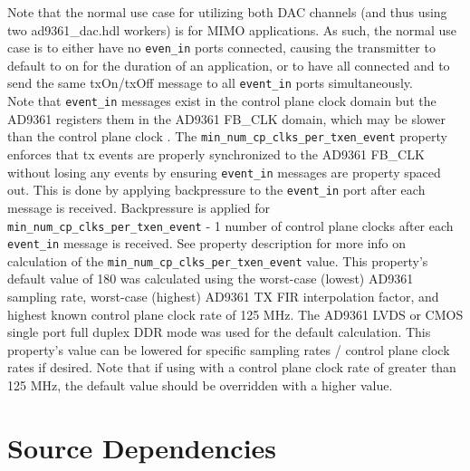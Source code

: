 \documentclass{article}
\def\comp{ad9361\_dac}
\begin{document}
Note that the normal use case for utilizing both DAC channels (and thus using two \comp.hdl workers) is for MIMO applications. As such, the normal use case is to either have no \verb+even_in+ ports connected, causing the transmitter to default to on for the duration of an application, or to have all connected and to send the same txOn/txOff message to all \verb+event_in+ ports simultaneously. \\

\pagebreak
\noindent Note that \verb+event_in+ messages exist in the control plane clock domain but the AD9361 registers them in the AD9361 FB\_CLK domain, which may be slower than the control plane clock . The \verb+min_num_cp_clks_per_txen_event+ property enforces that tx events are properly synchronized to the AD9361 FB\_CLK without losing any events by ensuring \verb+event_in+ messages are property spaced out. This is done by applying backpressure to the \verb+event_in+ port after each message is received. Backpressure is applied for \verb+min_num_cp_clks_per_txen_event+ - 1 number of control plane clocks after each \verb+event_in+ message is received. See property description for more info on calculation of the \verb+min_num_cp_clks_per_txen_event+ value. This property's default value of 180 was calculated using the worst-case (lowest) AD9361 sampling rate, worst-case (highest) AD9361 TX FIR interpolation factor, and highest known control plane clock rate of 125 MHz. The AD9361 LVDS or CMOS single port full duplex DDR mode was used for the default calculation. This property's value can be lowered for specific sampling rates / control plane clock rates if desired. Note that if using with a control plane clock rate of greater than 125 MHz, the default value should be overridden with a higher value.

\pagebreak


\section*{Source Dependencies}
\end{document}
